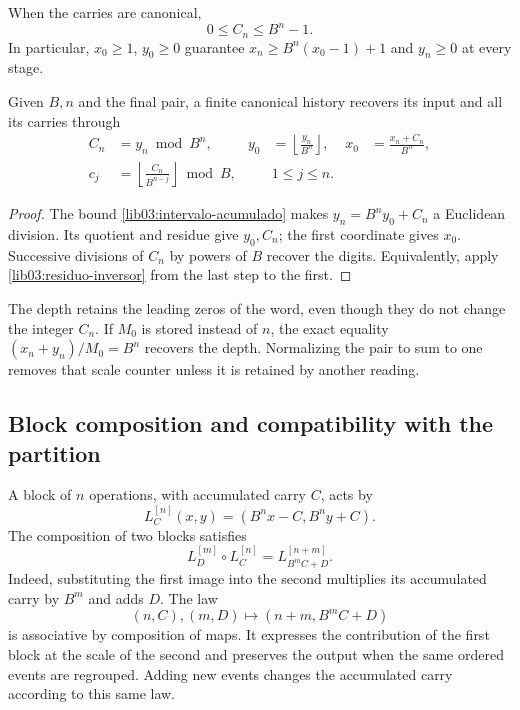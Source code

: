 When the carries are canonical,
\begin{equation}
 0\leq C_n\leq B^n-1.
 \label{lib03:intervalo-acumulado}
\end{equation}
In particular, \(x_0\geq1\), \(y_0\geq0\) guarantee
\(x_n\geq B^n(x_0-1)+1\) and \(y_n\geq0\) at every stage.

\begin{corollary}
\label{lib03:cor-palabra}
Given \(B,n\) and the final pair, a finite canonical history
recovers its input and all its carries through
\begin{align}
 C_n&=y_n\bmod B^n,&
 y_0&=\left\lfloor\frac{y_n}{B^n}\right\rfloor,&
 x_0&=\frac{x_n+C_n}{B^n},
 \label{lib03:recuperacion-inicial}\\
 c_j&=\left\lfloor\frac{C_n}{B^{n-j}}\right\rfloor\bmod B,
 &&1\leq j\leq n.
 \label{lib03:recuperacion-digitos}
\end{align}
\end{corollary}

\begin{proof}
The bound \eqref{lib03:intervalo-acumulado} makes
\(y_n=B^ny_0+C_n\) a Euclidean division. Its quotient and residue
give \(y_0,C_n\); the first coordinate gives \(x_0\).
Successive divisions of \(C_n\) by powers of \(B\) recover
the digits. Equivalently, apply
\eqref{lib03:residuo-inversor} from the last step to the first.
\end{proof}

The depth retains the leading zeros of the word, even though they
do not change the integer \(C_n\). If \(M_0\) is stored instead of
\(n\), the exact equality \((x_n+y_n)/M_0=B^n\) recovers the
depth. Normalizing the pair to sum to one removes that scale counter
unless it is retained by another reading.

\subsection{Block composition and compatibility with the partition}
\label{lib03:composicion}

A block of \(n\) operations, with accumulated carry \(C\), acts by
\begin{equation}
 L_C^{[n]}(x,y)=(B^nx-C,B^ny+C).
 \label{lib03:bloque}
\end{equation}
The composition of two blocks satisfies
\begin{equation}
 L_D^{[m]}\circ L_C^{[n]}=L_{B^mC+D}^{[n+m]}.
 \label{lib03:ley-bloques}
\end{equation}
Indeed, substituting the first image into the second multiplies its
accumulated carry by \(B^m\) and adds \(D\). The law
\[
 (n,C),(m,D)\longmapsto(n+m,B^mC+D)
\]
is associative by composition of maps. It expresses the contribution
of the first block at the scale of the second and preserves the output when
the same ordered events are regrouped. Adding new events changes
the accumulated carry according to this same law.

